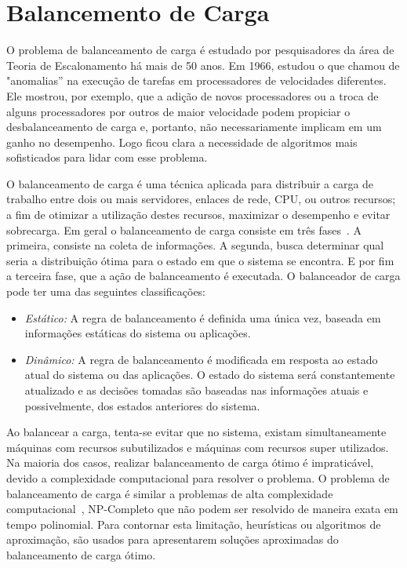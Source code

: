 \section{Balancemento de Carga}\label{intro:carga}

O problema de balanceamento de carga é estudado por pesquisadores da área de Teoria de Escalonamento há mais de 50 anos. Em 1966, \citep{graham66} estudou o que chamou de "anomalias'' na execução de tarefas em processadores de velocidades diferentes. Ele mostrou, por exemplo, que a adição de novos processadores ou a troca de alguns processadores por outros de maior velocidade podem propiciar o desbalanceamento de carga e, portanto, não necessariamente implicam em um ganho no desempenho. Logo ficou clara a necessidade de algoritmos mais sofisticados para lidar com esse problema.  

O balanceamento de carga é uma técnica aplicada para distribuir a carga de trabalho entre dois ou mais servidores, enlaces de rede, CPU, ou outros recursos; a fim de otimizar a utilização destes recursos, maximizar o desempenho e evitar sobrecarga. Em geral o balanceamento de carga consiste em três fases~\citep{carga}. A primeira, consiste na coleta de informações. A segunda, busca determinar qual seria a distribuição ótima para o estado em que o sistema se encontra. E por fim a terceira fase, que a ação de balanceamento é executada. O balanceador de carga pode ter uma das seguintes classificações:

\begin{itemize}
\item \textit{Estático:} A regra de balanceamento é definida uma única vez, baseada em informações estáticas do sistema ou aplicações.

\item \textit{Dinâmico:} A regra de balanceamento é modificada em resposta ao estado atual do sistema ou das aplicações. O estado do sistema será constantemente atualizado e as decisões tomadas são baseadas nas informações atuais e possivelmente, dos estados anteriores do sistema.
\end{itemize}

Ao balancear a carga, tenta-se evitar que no sistema, existam simultaneamente máquinas com recursos subutilizados e máquinas com recursos super utilizados. Na maioria dos casos, realizar balanceamento de carga ótimo é impraticável, devido a complexidade computacional para resolver o problema. O problema de balanceamento de carga  é similar a problemas de alta complexidade computacional~\citep{virtual}, NP-Completo que não podem ser resolvido de maneira exata em tempo polinomial. Para contornar esta limitação, heurísticas ou algoritmos de aproximação, são usados para apresentarem soluções aproximadas do balanceamento de carga ótimo.


